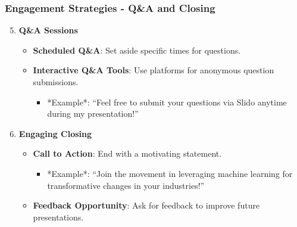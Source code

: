 \documentclass[aspectratio=169]{beamer}
\begin{document}
\begin{frame}[fragile]
    \frametitle{Engagement Strategies - Q&A and Closing}
    \begin{enumerate}
        \setcounter{enumi}{4} %
        
        \item \textbf{Q\&A Sessions}
        \begin{itemize}
            \item \textbf{Scheduled Q\&A}: Set aside specific times for questions.
            \item \textbf{Interactive Q\&A Tools}: Use platforms for anonymous question submissions.
            \begin{itemize}
                \item *Example*: ``Feel free to submit your questions via Slido anytime during my presentation!''
            \end{itemize}
        \end{itemize}
        
        \item \textbf{Engaging Closing}
        \begin{itemize}
            \item \textbf{Call to Action}: End with a motivating statement.
            \begin{itemize}
                \item *Example*: ``Join the movement in leveraging machine learning for transformative changes in your industries!''
            \end{itemize}
            \item \textbf{Feedback Opportunity}: Ask for feedback to improve future presentations.
        \end{itemize}
    \end{enumerate}
\end{frame}
\end{document}
